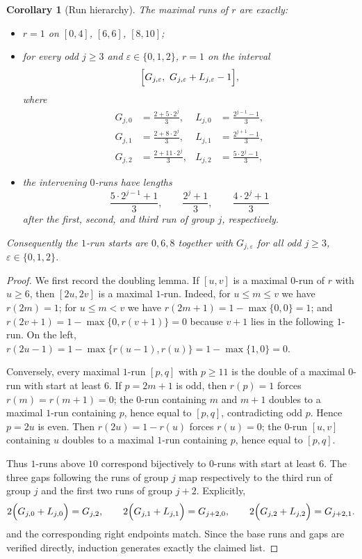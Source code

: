 \documentclass[11pt]{article}
\newtheorem{corollary}[theorem]{Corollary}
\theoremstyle{remark}
\begin{document}
\begin{corollary}[Run hierarchy]\label{cor:C runs}
The maximal runs of $r$ are exactly:
\begin{itemize}\itemsep0.1em
\item $r=1$ on $[0,4]$, $[6,6]$, $[8,10]$;
\item for every odd $j\ge3$ and $\varepsilon\in\{0,1,2\}$, $r=1$ on the interval
\[
\Bigl[G_{j,\varepsilon},\ G_{j,\varepsilon}+L_{j,\varepsilon}-1\Bigr],
\]
where
\begin{align*}
G_{j,0}&=\frac{2+5\cdot2^{j}}{3}, & L_{j,0}&=\frac{2^{j-1}-1}{3},\\
G_{j,1}&=\frac{2+8\cdot2^{j}}{3}, & L_{j,1}&=\frac{2^{j+1}-1}{3},\\
G_{j,2}&=\frac{2+11\cdot2^{j}}{3}, & L_{j,2}&=\frac{5\cdot2^{j}-1}{3},
\end{align*}
\item the intervening $0$-runs have lengths
\[
\frac{5\cdot2^{j-1}+1}{3},\qquad \frac{2^{j}+1}{3},\qquad \frac{4\cdot2^{j}+1}{3}
\]
after the first, second, and third run of group $j$, respectively.
\end{itemize}
Consequently the $1$-run starts are $0,6,8$ together with $G_{j,\varepsilon}$ for all odd $j\ge3$, $\varepsilon\in\{0,1,2\}$.
\end{corollary}
\begin{proof}
We first record the doubling lemma. If $[u,v]$ is a maximal $0$-run of $r$ with $u\ge6$, then $[2u,2v]$ is a maximal $1$-run. Indeed, for $u\le m\le v$ we have $r(2m)=1$; for $u\le m<v$ we have $r(2m+1)=1-\max\{0,0\}=1$; and $r(2v+1)=1-\max\{0,r(v+1)\}=0$ because $v+1$ lies in the following $1$-run. On the left, $r(2u-1)=1-\max\{r(u-1),r(u)\}=1-\max\{1,0\}=0$.

Conversely, every maximal $1$-run $[p,q]$ with $p\ge11$ is the double of a maximal $0$-run with start at least $6$. If $p=2m+1$ is odd, then $r(p)=1$ forces $r(m)=r(m+1)=0$; the $0$-run containing $m$ and $m+1$ doubles to a maximal $1$-run containing $p$, hence equal to $[p,q]$, contradicting odd $p$. Hence $p=2u$ is even. Then $r(2u)=1-r(u)$ forces $r(u)=0$; the $0$-run $[u,v]$ containing $u$ doubles to a maximal $1$-run containing $p$, hence equal to $[p,q]$.

Thus $1$-runs above $10$ correspond bijectively to $0$-runs with start at least $6$. The three gaps following the runs of group $j$ map respectively to the third run of group $j$ and the first two runs of group $j+2$. Explicitly,
\[
2\Bigl(G_{j,0}+L_{j,0}\Bigr)=G_{j,2},\qquad
2\Bigl(G_{j,1}+L_{j,1}\Bigr)=G_{j+2,0},\qquad
2\Bigl(G_{j,2}+L_{j,2}\Bigr)=G_{j+2,1}.
\]
and the corresponding right endpoints match. Since the base runs and gaps are verified directly, induction generates exactly the claimed list.
\end{proof}
\end{document}
